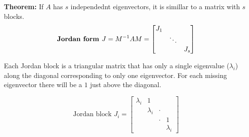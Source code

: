 \textbf{Theorem:} If $A$ has $s$ independednt eigenvectors, it is simillar to a matrix with $s$ blocks.\\
$$
\text{\textbf{Jordan form }}
J = M^{-1}AM =
\begin{bmatrix}
J_1 & & \\
& \ddots & \\
& & J_s\\
\end{bmatrix}
$$

Each Jordan block is a triangular matrix that has only a single eigenvalue ($\lambda_i$) along the diagonal corresponding to only one eigenvector. For each missing eigenvector there will be a $1$ just above the diagonal.


$$
\text{Jordan block }
J_i = 
\begin{bmatrix}
\lambda_i & 1 & & \\
& \lambda_i &  \cdot & \\
& & \cdot & 1\\
& & & \lambda_i
\end{bmatrix}
$$
